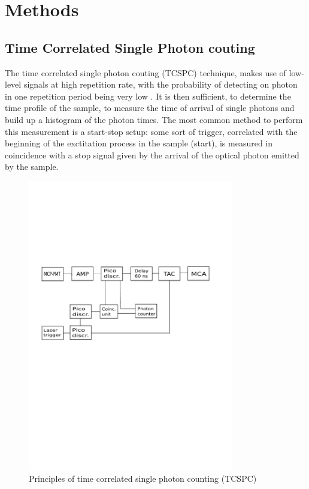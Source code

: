 
\chapter{Methods}

\section{Time Correlated Single Photon couting}

The time correlated single photon couting (TCSPC) technique, makes use of low-level signals at high repetition rate, with the probability of detecting on photon in one repetition period being very low \cite{Becker2005}.
It is then sufficient, to determine the time profile of the sample, to measure the time of arrival of single photons and build up a histogram of the photon times.
The most common method to perform this measurement is a start-stop setup: some sort of trigger, correlated with the beginning of the exctitation process in the sample (start), is measured in coincidence with a stop signal given by the arrival of the optical photon emitted by the sample.
\begin{figure}[htbp]
\begin{center}
\includegraphics[width=9cm]{../Pictures/Chapter_8/electronics.pdf}
\end{center}
\caption[TCSPC technique]{Principles of time correlated single photon counting (TCSPC)}
\label{fig:daw}
\end{figure}

